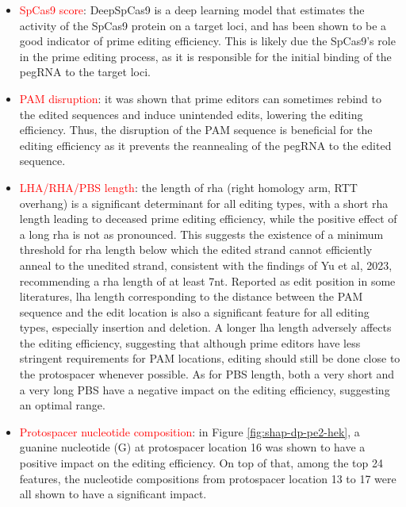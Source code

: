 \begin{itemize}[itemsep=-0mm]
    \item \textcolor{red}{SpCas9 score}: DeepSpCas9 is a deep learning model that estimates the activity of the SpCas9 protein on a target loci, and has been shown to be a good indicator of prime editing efficiency\cite{kimPredictingEfficiencyPrime2021}. This is likely due the SpCas9's role in the prime editing process, as it is responsible for the initial binding of the pegRNA to the target loci. 
    \item \textcolor{red}{PAM disruption}: it was shown that prime editors can sometimes rebind to the edited sequences and induce unintended edits, lowering the editing efficiency\cite{liudavidr.SearchandreplaceGenomeEditing2019}. Thus, the disruption of the PAM sequence is beneficial for the editing efficiency as it prevents the reannealing of the pegRNA to the edited sequence.
    \item \textcolor{red}{LHA/RHA/PBS length}: the length of rha (right homology arm, RTT overhang) is a significant determinant for all editing types, with a short rha length leading to deceased prime editing efficiency, while the positive effect of a long rha is not as pronounced. This suggests the existence of a minimum threshold for rha length below which the edited strand cannot efficiently anneal to the unedited strand, consistent with the findings of Yu et al, 2023, recommending a rha length of at least 7nt\cite{yuPredictionEfficienciesDiverse2023}. Reported as edit position in some literatures, lha length corresponding to the distance between the PAM sequence and the edit location is also a significant feature for all editing types, especially insertion and deletion. A longer lha length adversely affects the editing efficiency, suggesting that although prime editors have less stringent requirements for PAM locations, editing should still be done close to the protospacer whenever possible. As for PBS length, both a very short and a very long PBS have a negative impact on the editing efficiency, suggesting an optimal range.
    \item \textcolor{red}{Protospacer nucleotide composition}: in Figure \ref{fig:shap-dp-pe2-hek}, a guanine nucleotide (G) at protospacer location 16 was shown to have a positive impact on the editing efficiency. On top of that, among the top 24 features, the nucleotide compositions from protospacer location 13 to 17 were all shown to have a significant impact. 
\end{itemize}


